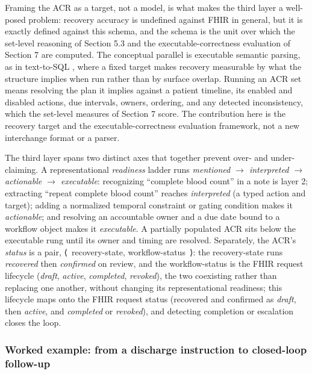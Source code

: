 Framing the ACR as a target, not a model, is what makes the third layer a well-posed problem: recovery accuracy is undefined against FHIR in general, but it is exactly defined against this schema, and the schema is the unit over which the set-level reasoning of Section 5.3 and the executable-correctness evaluation of Section 7 are computed. The conceptual parallel is executable semantic parsing, as in text-to-SQL \cite{ref31}, where a fixed target makes recovery measurable by what the structure implies when run rather than by surface overlap. Running an ACR set means resolving the plan it implies against a patient timeline, its enabled and disabled actions, due intervals, owners, ordering, and any detected inconsistency, which the set-level measures of Section 7 score. The contribution here is the recovery target and the executable-correctness evaluation framework, not a new interchange format or a parser.

The third layer spans two distinct axes that together prevent over- and under-claiming. A representational \emph{readiness} ladder runs \emph{mentioned $\rightarrow$ interpreted $\rightarrow$ actionable $\rightarrow$ executable}: recognizing ``complete blood count'' in a note is layer 2; extracting ``repeat complete blood count'' reaches \emph{interpreted} (a typed action and target); adding a normalized temporal constraint or gating condition makes it \emph{actionable}; and resolving an accountable owner and a due date bound to a workflow object makes it \emph{executable}. A partially populated ACR sits below the executable rung until its owner and timing are resolved. Separately, the ACR's \emph{status} is a pair, ⟨~recovery-state, workflow-status~⟩: the recovery-state runs \emph{recovered} then \emph{confirmed} on review, and the workflow-status is the FHIR request lifecycle (\emph{draft}, \emph{active}, \emph{completed}, \emph{revoked}), the two coexisting rather than replacing one another, without changing its representational readiness; this lifecycle maps onto the FHIR request status (recovered and confirmed as \emph{draft}, then \emph{active}, and \emph{completed} or \emph{revoked}), and detecting completion or escalation closes the loop.

\subsubsection{Worked example: from a discharge instruction to closed-loop follow-up}\label{worked-example-from-a-discharge-instruction-to-closed-loop-follow-up}

